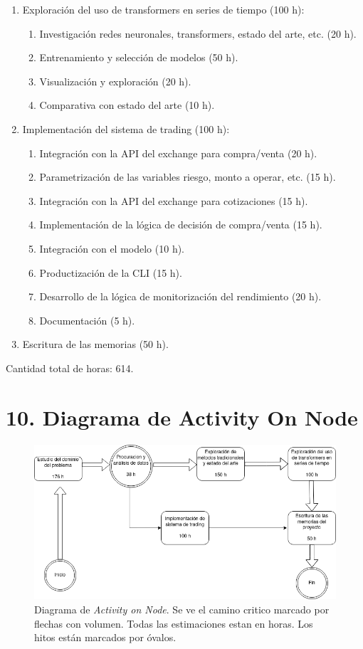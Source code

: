 \documentclass[
    11pt, %
]{charter}
\begin{document}
\begin{enumerate}
    \item Exploración del uso de transformers en series de tiempo (100 h):
      \begin{enumerate}
      \item Investigación redes neuronales, transformers, estado del arte, etc. (20 h).
      \item Entrenamiento y selección de modelos (50 h).
      \item Visualización y exploración (20 h).
      \item Comparativa con estado del arte (10 h).
      \end{enumerate}

    \item Implementación del sistema de trading (100 h):
      \begin{enumerate}
      \item Integración con la API del exchange para compra/venta (20 h).
      \item Parametrización de las variables riesgo, monto a operar, etc. (15 h).
      \item Integración con la API del exchange para cotizaciones (15 h).
      \item Implementación de la lógica de decisión de compra/venta (15 h).
      \item Integración con el modelo (10 h).
      \item Productización de la CLI (15 h).
      \item Desarrollo de la lógica de monitorización del rendimiento (20 h).
      \item Documentación (5 h).
      \end{enumerate}

    \item Escritura de las memorias (50 h).
    \end{enumerate}

    Cantidad total de horas: 614.
    \section{10. Diagrama de Activity On Node}
    \label{sec:AoN}


    \begin{figure}[htpb]
      \centering
      \includegraphics[width=.95\textwidth]{./Figuras/aon.drawio.png}
      \caption{Diagrama de \textit{Activity on Node}. Se ve el camino critico marcado por flechas con volumen. Todas las estimaciones estan en horas. Los hitos están marcados por óvalos.}
      \label{fig:AoN}
    \end{figure}
\end{document}
